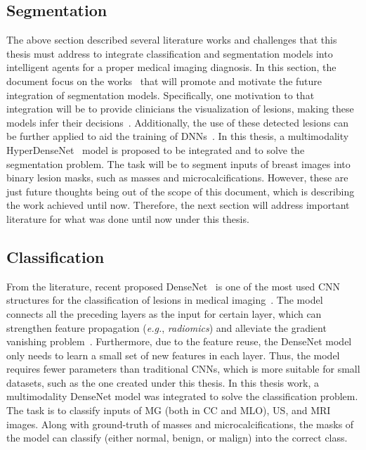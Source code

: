 \subsection{Segmentation}
\label{sec:sec003007001}

The above section described several literature works and challenges that this thesis must address to integrate classification and segmentation models into intelligent agents for a proper medical imaging diagnosis.
In this section, the document focus on the works~\cite{7412749, Dabbous397} that will promote and motivate the future integration of segmentation models.
Specifically, one motivation to that integration will be to provide clinicians the visualization of lesions, making these models infer their decisions~\cite{CHOUGRAD201819, doi:10.1148/radiol.2018181371}.
Additionally, the use of these detected lesions can be further applied to aid the training of \acp{DNN}~\cite{8032490, 8861376}.
In this thesis, a multimodality HyperDenseNet~\cite{8515234} model is proposed to be integrated and to solve the segmentation problem.
The task will be to segment inputs of breast images into binary lesion masks, such as masses and microcalcifications.
However, these are just future thoughts being out of the scope of this document, which is describing the work achieved until now.
Therefore, the next section will address important literature for what was done until now under this thesis.

\subsection{Classification}
\label{sec:sec003007002}

From the literature, recent proposed \ac{DenseNet}~\cite{Huang_2017_CVPR} is one of the most used \ac{CNN} structures for the classification of lesions in medical imaging~\cite{LIU2019e271}.
The model connects all the preceding layers as the input for certain layer, which can strengthen feature propagation ({\it e.g.}, {\it radiomics}) and alleviate the gradient vanishing problem~\cite{10.1145/3136755.3143016}.
Furthermore, due to the feature reuse, the \ac{DenseNet} model only needs to learn a small set of new features in each layer.
Thus, the model requires fewer parameters than traditional \acp{CNN}, which is more suitable for small datasets, such as the one created under this thesis.
In this thesis work, a multimodality \ac{DenseNet} model was integrated to solve the classification problem.
The task is to classify inputs of \ac{MG} (both in \ac{CC} and \ac{MLO}), \ac{US}, and \ac{MRI} images.
Along with ground-truth of masses and microcalcifications, the masks of the model can classify (either normal, benign, or malign) into the correct class.

